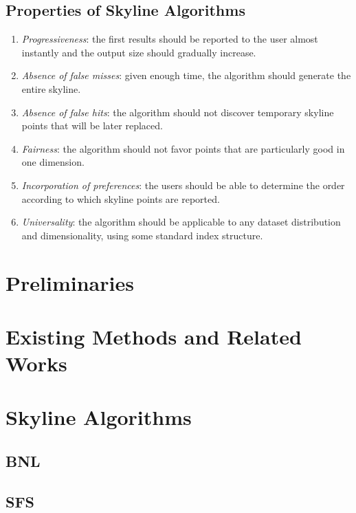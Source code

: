 \subsection{Properties of Skyline Algorithms}


\begin{enumerate}
\item \emph{Progressiveness}: the first results should be reported to the user almost instantly and the output size should gradually increase.

\item \emph{Absence of false misses}: given enough time, the algorithm should generate the entire skyline.

\item \emph{Absence of false hits}: the algorithm should not discover temporary skyline points that will be later replaced.

\item \emph{Fairness}: the algorithm should not favor points that are particularly good in one dimension.

\item \emph{Incorporation of preferences}: the users should be able to determine the order according to which skyline points are reported.

\item \emph{Universality}: the algorithm should be applicable to any dataset distribution and dimensionality, using some standard index structure.
\end{enumerate}


\section{Preliminaries}
\section{Existing Methods and Related Works}
\section{Skyline Algorithms}
\subsection{BNL}
\subsection{SFS}
